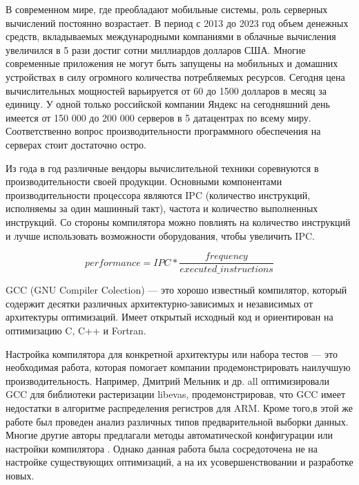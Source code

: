 
{\actuality} В современном мире, где преобладают мобильные системы, роль серверных вычислений постоянно возрастает. В период с 2013 до 2023 год объем денежных средств, вкладываемых  международными компаниями в облачные вычисления увеличился в 5 раз\ifsynopsis\else\phantom{ }\cite{spendingCloud,alam2020cloud}\phantom{ }\fi и достиг сотни миллиардов долларов США. Многие современные приложения не могут быть запущены на мобильных и домашних устройствах в силу огромного количества потребляемых ресурсов\ifsynopsis\else\phantom{ }\cite{marinescu2022cloud}\fi. Сегодня цена вычислительных мощностей варьируется от 60 до 1500  долларов в месяц за единицу\ifsynopsis\else\phantom{ }\cite{costCloud}\fi.  У одной только российской компании Яндекс на сегодняшний день имеется от 150 000  до 200 000 серверов в 5 датацентрах по всему миру\ifsynopsis\else \phantom{ }\cite{Yndx2}\fi. Соответственно вопрос производительности программного обеспечения на серверах стоит достаточно остро.

Из года в год различные вендоры вычислительной техники соревнуются в производительности своей продукции. Основными компонентами производительности процессора являются IPC (количество инструкций, исполняемы за один машинный такт), частота и количество выполненных инструкций\ifsynopsis\else\phantom{ }\cite{hennessy2011computer}\fi. Со стороны компилятора можно повлиять на количество инструкций и лучше использовать возможности оборудования, чтобы увеличить IPC\ifsynopsis\else \cite{alvares2021instruction}\fi.

$$performance = IPC * \dfrac{frequency}{executed\_instructions}$$

GCC (GNU Compiler Colection) — это хорошо известный компилятор\ifsynopsis\else\phantom{ }\cite{schmitt2020performance}\fi, который содержит десятки различных архитектурно-зависимых и независимых от архитектуры оптимизаций\ifsynopsis\else\phantom{ }\cite {rodriguez2021compiler}\fi. Имеет открытый исходный код и ориентирован на оптимизацию C, C++ и Fortran.

Настройка компилятора для конкретной архитектуры или набора тестов — это необходимая работа, которая помогает компании продемонстрировать наилучшую производительность. Например, Дмитрий Мельник и др. all \ifsynopsis\else\phantom{ }\cite{melnik2010case}\phantom{ }\fi оптимизировали GCC для библиотеки растеризации libevas, продемонстрировав, что GCC имеет недостатки в алгоритме распределения регистров для ARM. Кроме того,в этой же работе был проведен анализ различных типов предварительной выборки данных. Многие другие авторы предлагали методы автоматической конфигурации или настройки компилятора \ifsynopsis\else\phantom{ }\cite{plotnikov2013automatic,ashouri2018survey,cereda2020collaborative}\fi. Однако данная работа была сосредоточена не на настройке существующих оптимизаций, а на их усовершенствовании и разработке новых.


